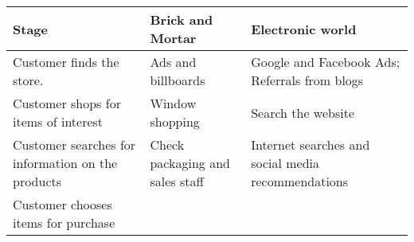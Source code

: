 \documentclass[]{book}
\begin{document}
\begin{longtable}[]{@{}lll@{}}
\toprule
\begin{minipage}[b]{0.15\columnwidth}\raggedright
Stage\strut
\end{minipage} & \begin{minipage}[b]{0.38\columnwidth}\raggedright
Brick and Mortar\strut
\end{minipage} & \begin{minipage}[b]{0.38\columnwidth}\raggedright
Electronic world\strut
\end{minipage}\tabularnewline
\midrule
\endhead
\begin{minipage}[t]{0.15\columnwidth}\raggedright
Customer finds the store.\strut
\end{minipage} & \begin{minipage}[t]{0.38\columnwidth}\raggedright
Ads and billboards\strut
\end{minipage} & \begin{minipage}[t]{0.38\columnwidth}\raggedright
Google and Facebook Ads; Referrals from blogs\strut
\end{minipage}\tabularnewline
\begin{minipage}[t]{0.15\columnwidth}\raggedright
Customer shops for items of interest\strut
\end{minipage} & \begin{minipage}[t]{0.38\columnwidth}\raggedright
Window shopping\strut
\end{minipage} & \begin{minipage}[t]{0.38\columnwidth}\raggedright
Search the website\strut
\end{minipage}\tabularnewline
\begin{minipage}[t]{0.15\columnwidth}\raggedright
Customer searches for information on the products\strut
\end{minipage} & \begin{minipage}[t]{0.38\columnwidth}\raggedright
Check packaging and sales staff\strut
\end{minipage} & \begin{minipage}[t]{0.38\columnwidth}\raggedright
Internet searches and social media recommendations\strut
\end{minipage}\tabularnewline
\begin{minipage}[t]{0.15\columnwidth}\raggedright
Customer chooses items for purchase\strut
\end{minipage} & \begin{minipage}[t]{0.38\columnwidth}\raggedright

\end{minipage}
\end{longtable}
\end{document}
